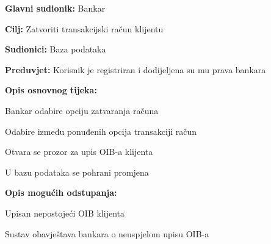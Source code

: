             \noindent {}
            \begin{packed_item}
            
              \item \textbf{Glavni sudionik: }Bankar
              \item  \textbf{Cilj:} Zatvoriti transakcijski račun klijentu
              \item  \textbf{Sudionici:} Baza podataka
              \item  \textbf{Preduvjet:} Korisnik je registriran i dodijeljena su mu prava bankara
              \item  \textbf{Opis osnovnog tijeka:}
              
              \item[] \begin{packed_enum}
            
                \item Bankar odabire opciju zatvaranja računa
                \item Odabire između  ponuđenih opcija transakciji račun 
                \item Otvara se prozor za upis OIB-a klijenta 
                \item U bazu podataka se pohrani promjena
              \end{packed_enum}
              
              \item  \textbf{Opis mogućih odstupanja:}
              
              \item[] \begin{packed_item}
            
                \item[3.a] Upisan nepostojeći OIB klijenta
                \item[] \begin{packed_enum}
                  
                  \item Sustav obavještava bankara o neuspjelom upisu OIB-a 
                  
                \end{packed_enum}
                
              \end{packed_item}
            \end{packed_item}
            
